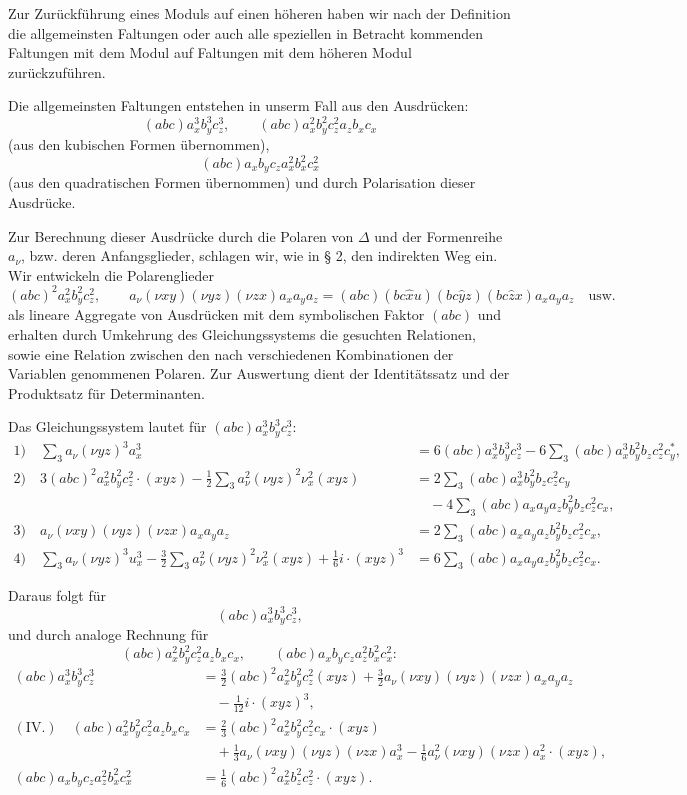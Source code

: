 \documentclass[11pt]{article}
\newcommand{\A}{\Delta}
\begin{document}
Zur Zurückführung eines Moduls auf einen höheren haben wir nach der Definition die allgemeinsten Faltungen oder auch alle speziellen in Betracht kommenden Faltungen mit dem Modul auf Faltungen mit dem höheren Modul zurückzuführen.

Die allgemeinsten Faltungen entstehen in unserm Fall aus den Ausdrücken:
\[
(abc)a_x^3b_y^3c_z^3,\qquad
(abc)a_x^2b_y^2c_z^2a_zb_xc_x
\]
(aus den kubischen Formen übernommen),
\[
(abc)a_xb_yc_za_x^2b_x^2c_x^2
\]
(aus den quadratischen Formen übernommen) und durch Polarisation dieser Ausdrücke.

Zur Berechnung dieser Ausdrücke durch die Polaren von $\A$ und der Formenreihe $a_\nu$, bzw. deren Anfangsglieder, schlagen wir, wie in § 2, den indirekten Weg ein. Wir entwickeln die Polarenglieder
\[
(abc)^2a_x^2b_y^2c_z^2,\qquad
a_\nu(\nu xy)(\nu yz)(\nu zx)a_xa_ya_z
=(abc)(bc\widehat{x}u)(bc\widehat{y}z)(bc\widehat{z}x)a_xa_ya_z\quad\text{usw.}
\]
als lineare Aggregate von Ausdrücken mit dem symbolischen Faktor $(abc)$ und erhalten durch Umkehrung des Gleichungssystems die gesuchten Relationen, sowie eine Relation zwischen den nach verschiedenen Kombinationen der Variablen genommenen Polaren. Zur Auswertung dient der Identitätssatz und der Produktsatz für Determinanten.

Das Gleichungssystem lautet für $(abc)a_x^3b_y^3c_z^3$:
\begingroup\small
\[
\begin{aligned}
1)\quad
\sum_3 a_\nu(\nu yz)^3a_x^3
&=6(abc)a_x^3b_y^3c_z^3
-6\sum_3(abc)a_x^3b_y^2b_zc_z^2c_y^{*},\\[0.4em]
2)\quad
3(abc)^2a_x^2b_y^2c_z^2\cdot(xyz)
-\frac12\sum_3 a_\nu^2(\nu yz)^2\nu_x^2(xyz)
&=2\sum_3(abc)a_x^3b_y^2b_zc_z^2c_y\\
&\quad-4\sum_3(abc)a_xa_ya_zb_y^2b_zc_z^2c_x,\\[0.4em]
3)\quad
a_\nu(\nu xy)(\nu yz)(\nu zx)a_xa_ya_z
&=2\sum_3(abc)a_xa_ya_zb_y^2b_zc_z^2c_x,\\[0.4em]
4)\quad
\sum_3 a_\nu(\nu yz)^3u_x^3
-\frac32\sum_3 a_\nu^2(\nu yz)^2\nu_x^2(xyz)
+\frac16 i\cdot(xyz)^3
&=6\sum_3(abc)a_xa_ya_zb_y^2b_zc_z^2c_x.
\end{aligned}
\]
\endgroup

Daraus folgt für
\[
(abc)a_x^3b_y^3c_z^3,
\]
und durch analoge Rechnung für
\[
(abc)a_x^2b_y^2c_z^2a_zb_xc_x,\qquad
(abc)a_xb_yc_za_z^2b_x^2c_x^2:
\]
\[
\begin{aligned}
(abc)a_x^3b_y^3c_z^3
&=\frac32(abc)^2a_x^2b_y^2c_z^2(xyz)
+\frac32 a_\nu(\nu xy)(\nu yz)(\nu zx)a_xa_ya_z\\
&\quad-\frac1{12}i\cdot(xyz)^3,\\[0.4em]
(\text{IV.})\quad
(abc)a_x^2b_y^2c_z^2a_zb_xc_x
&=\frac23(abc)^2a_x^2b_y^2c_z^2c_x\cdot(xyz)\\
&\quad+\frac13a_\nu(\nu xy)(\nu yz)(\nu zx)a_x^3
-\frac16 a_\nu^2(\nu xy)(\nu zx)a_x^2\cdot(xyz),\\[0.4em]
(abc)a_xb_yc_za_z^2b_x^2c_x^2
&=\frac16(abc)^2a_x^2b_z^2c_z^2\cdot(xyz).
\end{aligned}
\]
\end{document}
